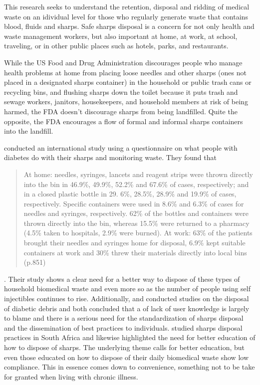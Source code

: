 \documentclass[12pt]{article}
\begin{document}
This research seeks to understand the retention, disposal and ridding of medical waste on an idividual level for those who regularly generate waste that contains blood, fluids and sharps.
Safe sharps disposal is a concern for not only health and waste management workers, but also important at home, at work, at school, traveling, or in other public places such as hotels, parks, and restaurants. 

While the US Food and Drug Administration discourages people who manage health problems at home from placing loose needles and other sharps (ones not placed in a designated sharps container) in the household or public trash cans or recycling bins, and flushing sharps down the toilet because it puts trash and sewage workers, janitors, housekeepers, and household members at risk of being harmed, the FDA doesn't discourage sharps from being landfilled. Quite the opposite, the FDA encourages a flow of formal and informal sharps containers into the landfill. 

\citet{bouhanick_what_2000} conducted an international study using a questionnaire on what people with diabetes do with their sharps and monitoring waste. They found that \begin{quote} At home: needles, syringes, lancets and reagent strips were thrown directly into the bin in 46.9\%, 49.9\%, 52.2\% and 67.6\% of cases, respectively; and in a closed plastic bottle in 29. 6\%, 28.5\%, 28.9\% and 19.9\% of cases, respectively. Specific containers were used in 8.6\% and 6.3\% of cases for needles and syringes, respectively. 62\% of the bottles and containers were thrown directly into the bin, whereas 15.5\% were returned to a pharmacy (4.5\% taken to hospitals, 2.9\% were burned). At work: 63\% of the patients brought their needles and syringes home for disposal, 6.9\% kept suitable containers at work and 30\% threw their materials directly into local bins (p.851) \end{quote}. Their study shows a clear need for a better way to dispose of these types of household biomedical waste and even more so as the number of people using self injectibles continues to rise.  Additionally, \citet{crawshaw_disposal_2002} and \citet{dallel_disposal_2005} conducted studies  on the disposal of diabetic debris and both concluded that a of lack of user knowledge is largely to blame and there is a serious need for the standardization of sharps disposal and the dissemination of best practices to individuals. \citet{govender_sharps_2012} studied sharps disposal practices in South Africa and likewise highlighted the need for better education of how to dispose of sharps. The underlying theme calls for better education, but even those educated on how to dispose of their daily biomedical waste show low compliance. This in essence comes down to convenience, something not to be take for granted when living with chronic illness. 
\end{document}
